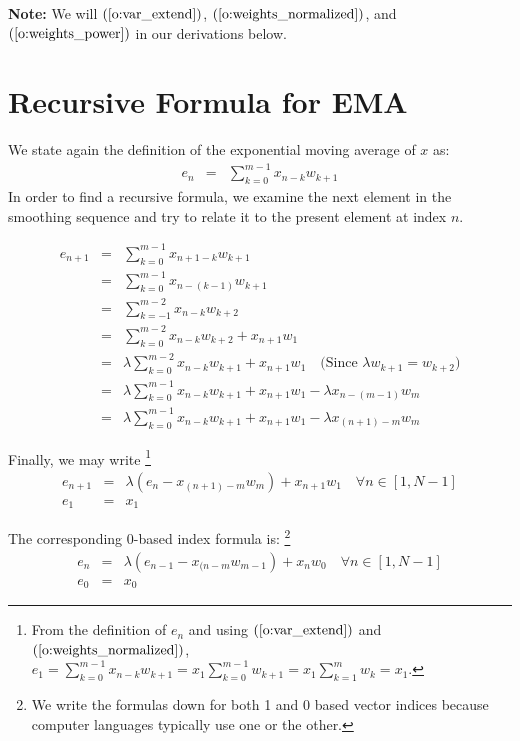 \documentclass{article}
\begin{document}
{\bf Note:\/} We will $(\ref{o:var_extend})$, $(\ref{o:weights_normalized})$,
and $(\ref{o:weights_power})$ in our derivations below.

\section{Recursive Formula for EMA}
We state again the definition of the exponential moving average of $x$ as:
\begin{eqnarray}
e_n & = & \sum_{k=0}^{m-1} x_{n-k} w_{k+1}
\end{eqnarray}
In order to find a recursive formula, we examine the next element in the smoothing sequence 
and try to relate it to the present element at index $n$.

\begin{eqnarray*}
e_{n+1} & = & \sum_{k=0}^{m-1} x_{n+1-k} w_{k+1} \\
        & = & \sum_{k=0}^{m-1} x_{n-(k-1)} w_{k+1} \\
        & = & \sum_{k=-1}^{m-2} x_{n-k} w_{k+2}  \\
        & = & \sum_{k=0}^{m-2} x_{n-k} w_{k+2}  + x_{n+1} w_1 \\
        & = & \lambda \sum_{k=0}^{m-2} x_{n-k} w_{k+1}  + x_{n+1} w_1  \quad \text{(Since $\lambda w_{k+1} = w_{k+2}$)} \\
        & = & \lambda \sum_{k=0}^{m-1} x_{n-k} w_{k+1}  + x_{n+1} w_1  
                - \lambda x_{n-(m-1)} w_m  \\
        & = & \lambda \sum_{k=0}^{m-1} x_{n-k} w_{k+1}  + x_{n+1} w_1  
                - \lambda x_{(n+1)-m} w_m 
\end{eqnarray*}

Finally, we may write%
\footnote{From the definition of $e_n$ and using 
$(\ref{o:var_extend})$ and $(\ref{o:weights_normalized})$,
$e_1 = \sum_{k=0}^{m-1} x_{n-k} w_{k+1} = x_1 \sum_{k=0}^{m-1} w_{k+1} = x_1 \sum_{k=1}^m w_k = x_1$.}
\begin{eqnarray}
    e_{n+1} & = & \lambda \left(e_n - x_{(n+1) - m} w_m \right) + x_{n+1} w_1  \quad \forall n \in [1, N-1] \\
    e_1     & = & x_1
\end{eqnarray}

The corresponding 0-based index formula is:%
\footnote{We write the formulas down for both 1 and  0 based vector indices because
computer languages typically use one or the other.}
\begin{eqnarray}
    e_{n} & = & \lambda \left( e_{n-1} - x_{(n-m} w_{m-1} \right) + x_{n} w_0  \quad \forall n \in [1, N-1] \\
    e_0     & = & x_0
\end{eqnarray}
\end{document}

